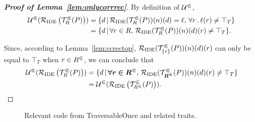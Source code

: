 \onlycorrrec*
\begin{proof}[\textbf{Proof of Lemma~\ref{lem:onlycorrrec}}]
  By definition of $\mathcal U^\Subset$,
  \begin{align*}
    \mathcal U^\Subset(\mathcal R_{\text{IDE}}\left(\mathcal T^\Subset_R(P)\right))
    &=\{d\,|\,\mathcal R_{\text{IDE}}(\mathcal T^\Subset_R(P))(n)(d)=\ell,\,\forall r\,.\,\ell(r)\ne\top_T\}\\
    &=\{d\,|\,\forall r\in R,\,\mathcal R_{\text{IDE}}(\mathcal T^\Subset_R(P))(n)(d)(r)\ne\top_T\}.
  \end{align*}
  
Since, according to Lemma~\ref{lem:ccrectop}, $\mathcal R_{\text{IDE}}(\mathcal T^\Subset_{\{r\}}(P))(n)(d)(r)$ can only be equal to $\top_T$ when $r\in{R^\Subset}$, we can conclude that
  \begin{align*}
    \mathcal U^\Subset(\mathcal R_{\text{IDE}}\left(\mathcal T^\Subset_R(P)\right))
    &=\{d\,|\,\bm{\forall r\in{R^\Subset}},\,\mathcal R_{\text{IDE}}(\mathcal T^\Subset_{\bm{{R^\Subset}}}(P))(n)(d)(r)\ne\top_T\}\\
    &=\mathcal U^\Subset(\mathcal R_{\text{IDE}}\left(\mathcal T^\Subset_{R^\Subset}(P)\right)).
    \qedhere
  \end{align*}
\end{proof}

\begin{figure}
\caption{Relevant code from \textsf{TraversableOnce} and related traits.}
\label{fig:traversableonce}
\end{figure}
